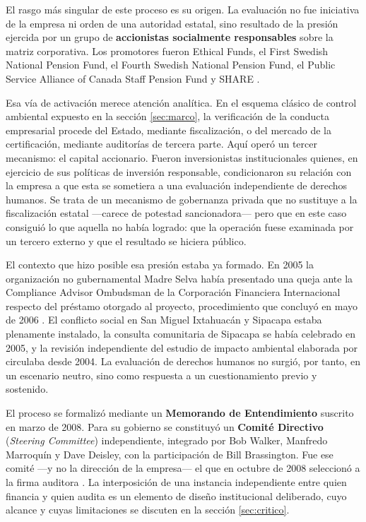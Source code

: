 El rasgo más singular de este proceso es su origen. La evaluación no fue iniciativa
de la empresa ni orden de una autoridad estatal, sino resultado de la presión
ejercida por un grupo de \textbf{accionistas socialmente responsables} sobre la
matriz corporativa. Los promotores fueron Ethical Funds, el First Swedish
National Pension Fund, el Fourth Swedish National Pension Fund, el Public Service
Alliance of Canada Staff Pension Fund y SHARE
\parencite{oncommonground2010hria}.

Esa vía de activación merece atención analítica. En el esquema clásico de control
ambiental expuesto en la sección \ref{sec:marco}, la verificación de la conducta
empresarial procede del Estado, mediante fiscalización, o del mercado de la
certificación, mediante auditorías de tercera parte. Aquí operó un tercer
mecanismo: el capital accionario. Fueron inversionistas institucionales quienes,
en ejercicio de sus políticas de inversión responsable, condicionaron su relación
con la empresa a que esta se sometiera a una evaluación independiente de derechos
humanos. Se trata de un mecanismo de gobernanza privada que no sustituye a la
fiscalización estatal —carece de potestad sancionadora— pero que en este caso
consiguió lo que aquella no había logrado: que la operación fuese examinada por un
tercero externo y que el resultado se hiciera público.

El contexto que hizo posible esa presión estaba ya formado. En 2005 la
organización no gubernamental Madre Selva había presentado una queja ante la
Compliance Advisor Ombudsman de la Corporación Financiera Internacional respecto
del préstamo otorgado al proyecto, procedimiento que concluyó en mayo de 2006
\parencite{cao2006marlin}. El conflicto social en San Miguel Ixtahuacán y
Sipacapa estaba plenamente instalado, la consulta comunitaria de Sipacapa se había
celebrado en 2005, y la revisión independiente del estudio de impacto ambiental
elaborada por \textcite{moran2004review} circulaba desde 2004. La evaluación de
derechos humanos no surgió, por tanto, en un escenario neutro, sino como respuesta
a un cuestionamiento previo y sostenido.

El proceso se formalizó mediante un \textbf{Memorando de Entendimiento} suscrito en
marzo de 2008. Para su gobierno se constituyó un \textbf{Comité Directivo}
(\textit{Steering Committee}) independiente, integrado por Bob Walker, Manfredo
Marroquín y Dave Deisley, con la participación de Bill Brassington. Fue ese comité
—y no la dirección de la empresa— el que en octubre de 2008 seleccionó a la firma
auditora \parencite{oncommonground2010hria}. La interposición de una instancia
independiente entre quien financia y quien audita es un elemento de diseño
institucional deliberado, cuyo alcance y cuyas limitaciones se discuten en la
sección \ref{sec:critico}.

